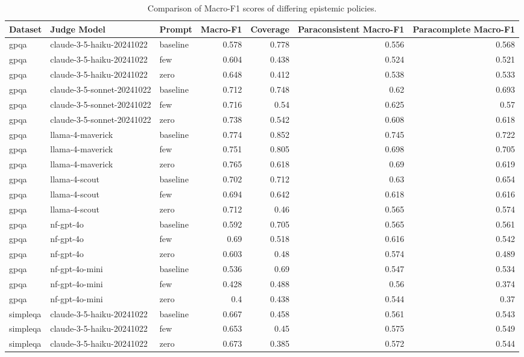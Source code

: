 \begin{table}[htbp]
\caption{Comparison of Macro-F1 scores of differing epistemic policies.}
\label{tab:expapprox}
\begin{tabular}{lllrrrr}
\toprule
Dataset & Judge Model & Prompt & Macro-F1 & Coverage & Paraconsistent Macro-F1 & Paracomplete Macro-F1 \\
\midrule
gpqa & claude-3-5-haiku-20241022 & baseline & 0.578 & 0.778 & 0.556 & 0.568 \\
gpqa & claude-3-5-haiku-20241022 & few & 0.604 & 0.438 & 0.524 & 0.521 \\
gpqa & claude-3-5-haiku-20241022 & zero & 0.648 & 0.412 & 0.538 & 0.533 \\
gpqa & claude-3-5-sonnet-20241022 & baseline & 0.712 & 0.748 & 0.62 & 0.693 \\
gpqa & claude-3-5-sonnet-20241022 & few & 0.716 & 0.54 & 0.625 & 0.57 \\
gpqa & claude-3-5-sonnet-20241022 & zero & 0.738 & 0.542 & 0.608 & 0.618 \\
gpqa & llama-4-maverick & baseline & 0.774 & 0.852 & 0.745 & 0.722 \\
gpqa & llama-4-maverick & few & 0.751 & 0.805 & 0.698 & 0.705 \\
gpqa & llama-4-maverick & zero & 0.765 & 0.618 & 0.69 & 0.619 \\
gpqa & llama-4-scout & baseline & 0.702 & 0.712 & 0.63 & 0.654 \\
gpqa & llama-4-scout & few & 0.694 & 0.642 & 0.618 & 0.616 \\
gpqa & llama-4-scout & zero & 0.712 & 0.46 & 0.565 & 0.574 \\
gpqa & nf-gpt-4o & baseline & 0.592 & 0.705 & 0.565 & 0.561 \\
gpqa & nf-gpt-4o & few & 0.69 & 0.518 & 0.616 & 0.542 \\
gpqa & nf-gpt-4o & zero & 0.603 & 0.48 & 0.574 & 0.489 \\
gpqa & nf-gpt-4o-mini & baseline & 0.536 & 0.69 & 0.547 & 0.534 \\
gpqa & nf-gpt-4o-mini & few & 0.428 & 0.488 & 0.56 & 0.374 \\
gpqa & nf-gpt-4o-mini & zero & 0.4 & 0.438 & 0.544 & 0.37 \\
simpleqa & claude-3-5-haiku-20241022 & baseline & 0.667 & 0.458 & 0.561 & 0.543 \\
simpleqa & claude-3-5-haiku-20241022 & few & 0.653 & 0.45 & 0.575 & 0.549 \\
simpleqa & claude-3-5-haiku-20241022 & zero & 0.673 & 0.385 & 0.572 & 0.544 \\

\end{tabular}
\end{table}
